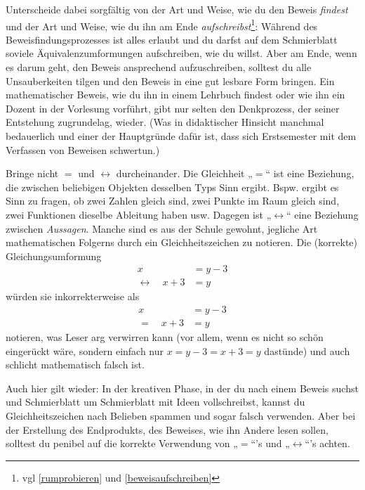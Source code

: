 \begin{bem}[„Gleichungs-U's“]
\begin{bew}
    \end{bew}
    Unterscheide dabei sorgfältig von der Art und Weise, wie du den Beweis \emph{findest} und der Art und Weise, wie du ihn am Ende \emph{aufschreibst}\footnote{vgl \cref{rumprobieren} und \cref{beweisaufschreiben}}: Während des Beweisfindungsprozesses ist alles erlaubt und du darfst auf dem Schmierblatt soviele Äquivalenzumformungen aufschreiben, wie du willst. Aber am Ende, wenn es darum geht, den Beweis ansprechend aufzuschreiben, solltest du alle Unsauberkeiten tilgen und den Beweis in eine gut lesbare Form bringen. Ein mathematischer Beweis, wie du ihn in einem Lehrbuch findest oder wie ihn ein Dozent in der Vorlesung vorführt, gibt nur selten den Denkprozess, der seiner Entstehung zugrundelag, wieder. (Was in didaktischer Hinsicht manchmal bedauerlich und einer der Hauptgründe dafür ist, dass sich Erstsemester mit dem Verfassen von Beweisen schwertun.)
\end{bem}


\begin{bem}[Unterschied zwischen $=$ und $\leftrightarrow$]
    Bringe nicht $=$ und $\leftrightarrow$ durcheinander. Die Gleichheit „$=$“ ist eine Beziehung, die zwischen beliebigen Objekten desselben Typs Sinn ergibt. Bspw. ergibt es Sinn zu fragen, ob zwei Zahlen gleich sind, zwei Punkte im Raum gleich sind, zwei Funktionen dieselbe Ableitung haben usw. Dagegen ist „$\leftrightarrow$“ eine Beziehung zwischen \emph{Aussagen}. Manche sind es aus der Schule gewohnt, jegliche Art mathematischen Folgerns durch ein Gleichheitszeichen zu notieren. Die (korrekte) Gleichungsumformung
    \begin{align*}
        x & = y-3 \\
        \leftrightarrow\quad  x+3 & = y
    \end{align*}
    würden sie inkorrekterweise als
    \begin{align*}
        x & = y-3 \\
        = \quad x+3 & = y
    \end{align*}
    notieren, was Leser arg verwirren kann (vor allem, wenn es nicht so schön eingerückt wäre, sondern einfach nur $x=y-3=x+3=y$ dastünde) und auch schlicht mathematisch falsch ist.
    
    Auch hier gilt wieder: In der kreativen Phase, in der du nach einem Beweis suchst und Schmierblatt um Schmierblatt mit Ideen vollschreibst, kannst du Gleichheitszeichen nach Belieben spammen und sogar falsch verwenden. Aber bei der Erstellung des Endprodukts, des Beweises, wie ihn Andere lesen sollen, solltest du penibel auf die korrekte Verwendung von „$=$“'s und „$\leftrightarrow$“'s achten.
\end{bem}


